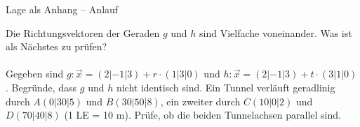 \begin{aufgabe}{Lage als Anhang – Anlauf}
\begin{teile}
\teil Die Richtungsvektoren der Geraden $g$ und $h$ sind Vielfache voneinander. Was ist als Nächstes zu prüfen?  \\  \\ 
\teil Gegeben sind $g\colon \vec x = (2 | -1 | 3) + r \cdot (1 | 3 | 0)$ und $h\colon \vec x = (2 | -1 | 3) + t \cdot (3 | 1 | 0)$. Begründe, dass $g$ und $h$ nicht identisch sind.
\teil Ein Tunnel verläuft geradlinig durch $A(0 | 30 | 5)$ und $B(30 | 50 | 8)$, ein zweiter durch $C(10 | 0 | 2)$ und $D(70 | 40 | 8)$ (1 LE = 10 m). Prüfe, ob die beiden Tunnelachsen parallel sind.
\end{teile}
\end{aufgabe}

